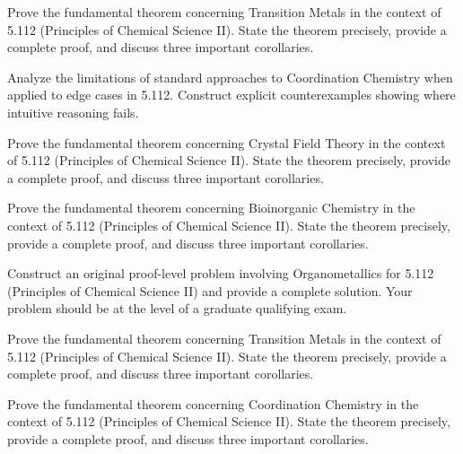 \documentclass[12pt,a4paper]{exam}
\begin{document}
\begin{questions}
\vspace{0.3cm}

\question[3]
Prove the fundamental theorem concerning Transition Metals in the context of 5.112 (Principles of Chemical Science II). State the theorem precisely, provide a complete proof, and discuss three important corollaries.

\vspace{0.3cm}

\question[5]
Analyze the limitations of standard approaches to Coordination Chemistry when applied to edge cases in 5.112. Construct explicit counterexamples showing where intuitive reasoning fails.

\vspace{0.3cm}

\question[7]
Prove the fundamental theorem concerning Crystal Field Theory in the context of 5.112 (Principles of Chemical Science II). State the theorem precisely, provide a complete proof, and discuss three important corollaries.

\vspace{0.3cm}

\question[5]
Prove the fundamental theorem concerning Bioinorganic Chemistry in the context of 5.112 (Principles of Chemical Science II). State the theorem precisely, provide a complete proof, and discuss three important corollaries.

\vspace{0.3cm}

\question[2]
Construct an original proof-level problem involving Organometallics for 5.112 (Principles of Chemical Science II) and provide a complete solution. Your problem should be at the level of a graduate qualifying exam.

\vspace{0.3cm}

\question[3]
Prove the fundamental theorem concerning Transition Metals in the context of 5.112 (Principles of Chemical Science II). State the theorem precisely, provide a complete proof, and discuss three important corollaries.

\vspace{0.3cm}

\question[2]
Prove the fundamental theorem concerning Coordination Chemistry in the context of 5.112 (Principles of Chemical Science II). State the theorem precisely, provide a complete proof, and discuss three important corollaries.

\vspace{0.3cm}


\end{questions}
\end{document}
